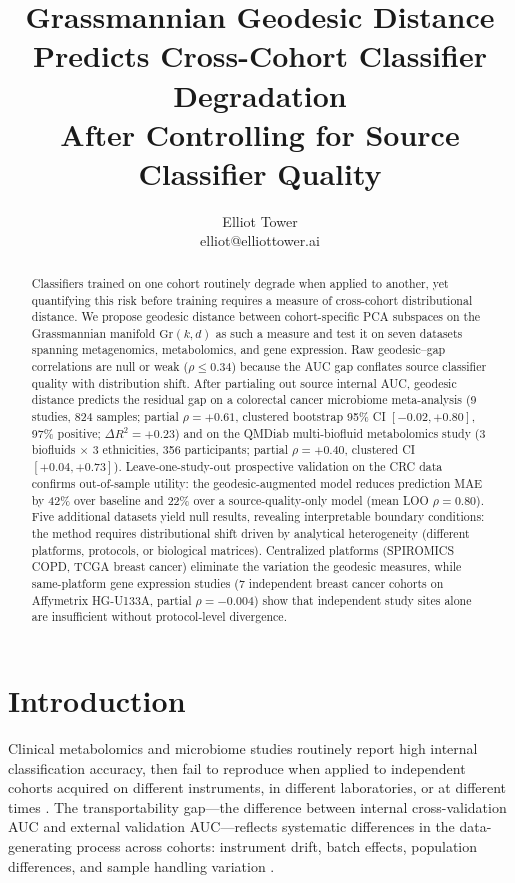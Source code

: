 \documentclass{article}
\title{Grassmannian Geodesic Distance Predicts Cross-Cohort Classifier Degradation\\After Controlling for Source Classifier Quality}
\author{\name Elliot Tower \\
      \email elliot@elliottower.ai}
\begin{document}
\maketitle

\begin{abstract}
Classifiers trained on one cohort routinely degrade when applied to another, yet quantifying this risk before training requires a measure of cross-cohort distributional distance. We propose geodesic distance between cohort-specific PCA subspaces on the Grassmannian manifold $\mathrm{Gr}(k, d)$ as such a measure and test it on seven datasets spanning metagenomics, metabolomics, and gene expression. Raw geodesic--gap correlations are null or weak ($\rho \leq 0.34$) because the AUC gap conflates source classifier quality with distribution shift. After partialing out source internal AUC, geodesic distance predicts the residual gap on a colorectal cancer microbiome meta-analysis (9 studies, 824 samples; partial $\rho = +0.61$, clustered bootstrap 95\% CI $[-0.02, +0.80]$, 97\% positive; $\Delta R^2 = +0.23$) and on the QMDiab multi-biofluid metabolomics study (3 biofluids $\times$ 3 ethnicities, 356 participants; partial $\rho = +0.40$, clustered CI $[+0.04, +0.73]$). Leave-one-study-out prospective validation on the CRC data confirms out-of-sample utility: the geodesic-augmented model reduces prediction MAE by 42\% over baseline and 22\% over a source-quality-only model (mean LOO $\rho = 0.80$). Five additional datasets yield null results, revealing interpretable boundary conditions: the method requires distributional shift driven by analytical heterogeneity (different platforms, protocols, or biological matrices). Centralized platforms (SPIROMICS COPD, TCGA breast cancer) eliminate the variation the geodesic measures, while same-platform gene expression studies (7 independent breast cancer cohorts on Affymetrix HG-U133A, partial $\rho = -0.004$) show that independent study sites alone are insufficient without protocol-level divergence.
\end{abstract}

\section{Introduction}

Clinical metabolomics and microbiome studies routinely report high internal classification accuracy, then fail to reproduce when applied to independent cohorts acquired on different instruments, in different laboratories, or at different times \citep{broadhurst2006statistical}. The transportability gap---the difference between internal cross-validation AUC and external validation AUC---reflects systematic differences in the data-generating process across cohorts: instrument drift, batch effects, population differences, and sample handling variation \citep{wehrens2016improved}.
\end{document}
